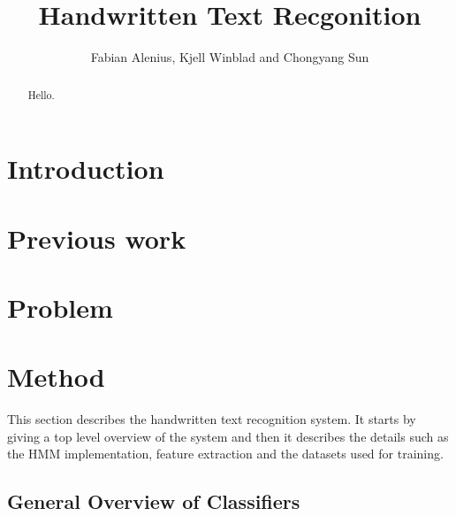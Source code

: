 \documentclass[11pt]{article}
\author{Fabian Alenius, Kjell Winblad and Chongyang Sun} \title{Handwritten Text Recgonition}
\begin{document}
\maketitle

\begin{abstract}
Hello.

\end{abstract}

\section{Introduction}



\section{Previous work}

\section{Problem}\label{sec:problem}

\section{Method}\label{sec:method}

This section describes the handwritten text recognition system. It starts by giving a top level overview of the system and then it describes the details such as the HMM implementation, feature extraction and the datasets used for training. 


\subsection{General Overview of Classifiers}\label{sec:overview_of_classifiers}


\end{document}
